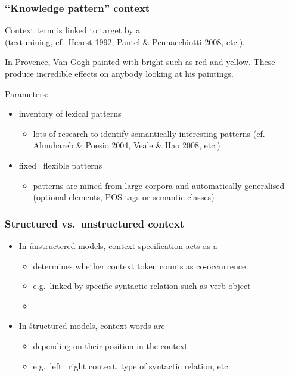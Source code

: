 \documentclass[t]{beamer} %
\begin{document}
\begin{frame}
  \frametitle{``Knowledge pattern'' context}
  
  \begin{center}
    Context term is linked to target by a \\
    (text mining, cf.\ Hearst 1992, Pantel \& Pennacchiotti 2008, etc.).
  \end{center}  

  In Provence, Van Gogh painted with bright 
  {\color{counterpoint}such as} {\color{secondary}red} {\color{counterpoint}and}
  {\color{secondary}yellow}.  These 
  {\color{counterpoint}produce} incredible {\color{secondary}effects} on
  anybody looking at his paintings.
  
  \gap
  Parameters:
  \begin{itemize}
  \item inventory of lexical patterns
    \begin{itemize}
    \item lots of research to identify semantically interesting patterns (cf. Almuhareb \& Poesio 2004,
      Veale \& Hao 2008, etc.)
    \end{itemize}
  \item fixed \vs\ flexible patterns
    \begin{itemize}
    \item patterns are mined from large corpora and automatically generalised (optional elements, POS tags or semantic classes)
    \end{itemize}
  \end{itemize}
\end{frame}

\begin{frame}[c]
  \frametitle{Structured vs.\ unstructured context}

  \begin{itemize}
  \item In \h{unstructered} models, context specification acts as a 
    \begin{itemize}
    \item determines whether context token counts as co-occurrence
    \item e.g.\ linked by specific syntactic relation such as verb-object
    \item[]
    \end{itemize}
    \pause
  \item In \h{structured} models, context words are 
    \begin{itemize}
    \item depending on their position in the context
    \item e.g.\ left \vs\ right context, type of syntactic relation, etc.
    \end{itemize}
  \end{itemize}
\end{frame}
\end{document}
